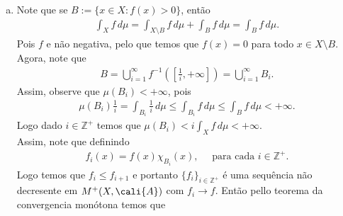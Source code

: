 \begin{homeworkProblem}[1]
\begin{solution}
\begin{enumerate}[a)]
\begin{align*}
      \end{align*}
      Agora, note que pela hipótese temos que existe um $j\in\mathbb{Z}^{+}$ tal que  $A_j\in \{A_i\}_{i\in\mathbb{Z}^{+}}$ e $\mu(A_j)=+\infty$.\\
      Daí que, definindo $\varphi:X\to\mathbb{R}$ dada por
      \begin{align*}
        \varphi(x)=\frac{1}{j}\chi_{A_j}(x),
      \end{align*}
      temos que $\varphi(x)\leq f(x)$ para todo $x\in X$.\\
      Logo note que como $\varphi$ é simples sigue-se que 
      \begin{align*}
        \int_{X}\varphi\,d\mu= \frac{1}{j}\mu(A_j)=+\infty. 
      \end{align*}
      Assim, podemos afirmar que
      \begin{align*}
        +\infty=\frac{1}{j}\mu(A_j)=\int_{X}\varphi\,d\mu\leq\int_{X}f\,d\mu.
      \end{align*}
      O que é uma contradição, pois $\int_{X}f\,d\mu<+\infty$. Portanto, podemos concluir que o conjunto $\{x\in X: f(x)>0\}$ é $\sigma$-finito.
    \item Note que se $B:=\{x\in X:f(x)>0\}$, então
      \begin{align*}
        \int_{X}f\,d\mu=\int_{X\setminus B}f\,d\mu +\int_{B}f\,d\mu=\int_{B}f\,d\mu.
      \end{align*}
      Pois $f$ e não negativa, pelo que temos que $f(x)=0$ para todo $x\in X\setminus B$.\\
      Agora, note que
      \begin{align*}
        B=\bigcup_{i=1}^{\infty}f^{-1}\left( \left[ \frac{1}{i},+\infty \right] \right)=\bigcup_{i=1}^{\infty}B_i.
      \end{align*}
      Assim, observe que $\mu(B_i)<+\infty$, pois
      \begin{align*}
        \mu(B_i)\frac{1}{i}=\int_{B_i}\frac{1}{i}\,d\mu\leq \int_{B_i}f\,d\mu\leq \int_{B}f\,d\mu <+\infty.
      \end{align*}
      Logo dado $i\in\mathbb{Z}^{+}$ temos que $\mu(B_i)<i \int_{X}f\,d\mu<+\infty$.\\
      Assim, note que definindo
      \begin{align*}
        f_i(x)=f(x)\chi_{B_i}(x),\quad\text{ para cada }i\in\mathbb{Z}^{+}.
      \end{align*}
      Logo temos que $f_i\leq f_{i+1}$ e portanto $\{f_i\}_{i\in\mathbb{Z}^{+}}$ é uma sequência não decresente em $M^{+}(X,\cali{A})$ com $f_{i}\to f$. Então pello teorema da convergencia monótona temos que

\end{enumerate}
\end{solution}
\end{homeworkProblem}
